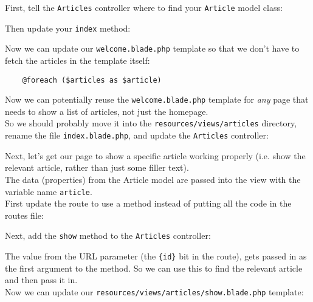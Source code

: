 First, tell the \texttt{Articles} controller where to find your \texttt{Article} model class:


Then update your \texttt{index} method:


Now we can update our \texttt{welcome.blade.php} template so that we don't have to fetch the articles in the template itself:

\begin{verbatim}
    @foreach ($articles as $article)
\end{verbatim}

Now we can potentially reuse the \texttt{welcome.blade.php} template for \textit{any} page that needs to show a list of articles, not just the homepage.
\\

So we should probably move it into the \texttt{resources/views/articles} directory, rename the file \texttt{index.blade.php}, and update the \texttt{Articles} controller:


Next, let's get our page to show a specific article working properly (i.e. show the relevant article, rather than just some filler text).
\\

The data (properties) from the Article model are passed into the view with the variable name \texttt{article}.
\\

First update the route to use a method instead of putting all the code in the routes file:


Next, add the \texttt{show} method to the \texttt{Articles} controller:


The value from the URL parameter (the \texttt{\{id\}} bit in the route), gets passed in as the first argument to the method. So we can use this to find the relevant article and then pass it in.
\\

Now we can update our \texttt{resources/views/articles/show.blade.php} template:

